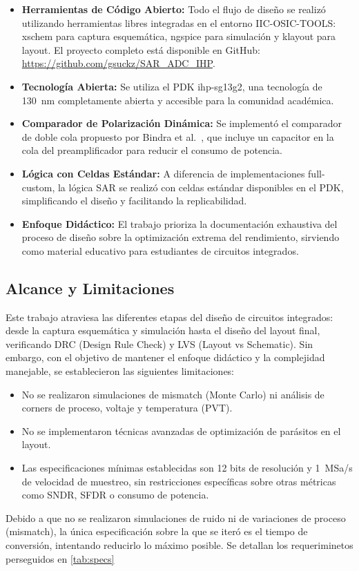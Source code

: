\documentclass[12pt,a4paper]{report}
\begin{document}
\begin{itemize}
    \item \textbf{Herramientas de Código Abierto:} Todo el flujo de diseño se realizó utilizando herramientas libres integradas en el entorno IIC-OSIC-TOOLS: xschem para captura esquemática, ngspice para simulación y klayout para layout. El proyecto completo está disponible en GitHub: \url{https://github.com/gsuckz/SAR_ADC_IHP}.
    
    \item \textbf{Tecnología Abierta:} Se utiliza el PDK ihp-sg13g2, una tecnología de 130~nm completamente abierta y accesible para la comunidad académica.
    
    \item \textbf{Comparador de Polarización Dinámica:} Se implementó el comparador de doble cola propuesto por Bindra et al.~\cite{bindra_comparator}, que incluye un capacitor en la cola del preamplificador para reducir el consumo de potencia.
    
    \item \textbf{Lógica con Celdas Estándar:} A diferencia de implementaciones full-custom, la lógica SAR se realizó con celdas estándar disponibles en el PDK, simplificando el diseño y facilitando la replicabilidad.
    
    \item \textbf{Enfoque Didáctico:} El trabajo prioriza la documentación exhaustiva del proceso de diseño sobre la optimización extrema del rendimiento, sirviendo como material educativo para estudiantes de circuitos integrados.
\end{itemize}

\subsection{Alcance y Limitaciones}

Este trabajo atraviesa las diferentes etapas del diseño de circuitos integrados: desde la captura esquemática y simulación hasta el diseño del layout final, verificando DRC (Design Rule Check) y LVS (Layout vs Schematic). Sin embargo, con el objetivo de mantener el enfoque didáctico y la complejidad manejable, se establecieron las siguientes limitaciones:

\begin{itemize}
    \item No se realizaron simulaciones de mismatch (Monte Carlo) ni análisis de corners de proceso, voltaje y temperatura (PVT).
    \item No se implementaron técnicas avanzadas de optimización de parásitos en el layout.
    \item Las especificaciones mínimas establecidas son 12 bits de resolución y 1~MSa/s de velocidad de muestreo, sin restricciones específicas sobre otras métricas como SNDR, SFDR o consumo de potencia.
\end{itemize}
Debido a que no se realizaron simulaciones de ruido ni de variaciones de proceso (mismatch), la única especificación sobre la que se iteró es el tiempo de conversión, intentando reducirlo lo máximo posible. Se detallan los requeriminetos perseguidos en \cref{tab:specs}
\end{document}
